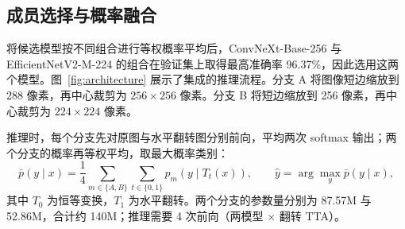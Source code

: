 \documentclass[11pt,a4paper,UTF8,fontset=windows]{ctexart}
\begin{document}
\subsection{成员选择与概率融合}

将候选模型按不同组合进行等权概率平均后，ConvNeXt-Base-256 与 EfficientNetV2-M-224 的组合在验证集上取得最高准确率 96.37\%，因此选用这两个模型。图~\ref{fig:architecture} 展示了集成的推理流程。分支 A 将图像短边缩放到 288 像素，再中心裁剪为 $256\times256$ 像素。分支 B 将短边缩放到 256 像素，再中心裁剪为 $224\times224$ 像素。

推理时，每个分支先对原图与水平翻转图分别前向，平均两次 softmax 输出；两个分支的概率再等权平均，取最大概率类别：
\begin{equation}
\bar p(y\mid x)=\frac{1}{4}\sum_{m\in\{A,B\}}\sum_{t\in\{0,1\}}p_m\!\left(y\mid T_t(x)\right),
\qquad
\hat y=\arg\max_y \bar p(y\mid x),
\label{eq:final-ensemble}
\end{equation}
其中 $T_0$ 为恒等变换，$T_1$ 为水平翻转。两个分支的参数量分别为 87.57M 与 52.86M，合计约 140M；推理需要 4 次前向（两模型 $\times$ 翻转 TTA）。
\end{document}
